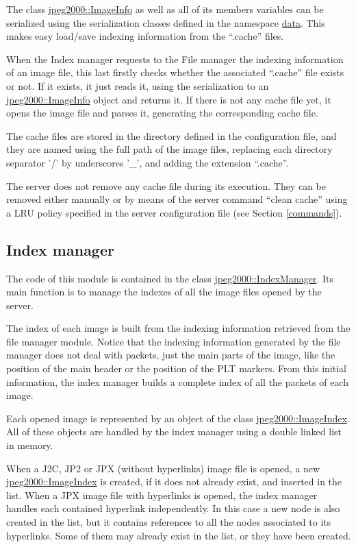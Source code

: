 The class \hyperlink{classjpeg2000_1_1ImageInfo}
{jpeg2000::ImageInfo} as well as all of its members variables
can be serialized using the serialization classes defined in
the namespace \hyperlink{namespacedata}{data}. This makes
easy load/save indexing information from the ``.cache'' files.

When the Index manager requests to the File manager the
indexing information of an image file, this last firstly checks
whether the associated ``.cache'' file exists or not. If it
exists, it just reads it, using the serialization to an 
\hyperlink{classjpeg2000_1_1ImageInfo}{jpeg2000::ImageInfo} object
and returns it. If there is not any cache file yet, it opens
the image file and parses it, generating the corresponding
cache file.

The cache files are stored in the directory defined in the configuration
file, and they are named using the full path of the image
files, replacing each directory separator '/' by underscores '\_',
and adding the extension ``.cache''. 

The server does not remove any cache file during its execution. They
can be removed either manually or by means of the server command
``clean cache'' using a LRU policy specified in the server configuration
file (see Section \ref{commands}).

\subsection{Index manager}

The code of this module is contained in the class 
\hyperlink{classjpeg2000_1_1IndexManager}{jpeg2000::IndexManager}. Its main
function is to manage the indexes of all the image files opened by the
server.

The index of each image is built from the indexing information retrieved
from the file manager module. Notice that the indexing information
generated by the file manager does not deal with packets, just the main
parts of the image, like the position of the main header or the
position of the PLT markers. From this initial information, the index
manager builds a complete index of all the packets of each image.

Each opened image is represented by an object of the class
\hyperlink{classjpeg2000_1_1ImageIndex}{jpeg2000::ImageIndex}. All
of these objects are handled by the index manager using a double linked
list in memory. 

When a J2C, JP2 or JPX (without hyperlinks) image file is opened, a
new \hyperlink{classjpeg2000_1_1ImageIndex}{jpeg2000::ImageIndex} is created,
if it does not already exist, and inserted in the list. When a JPX
image file with hyperlinks is opened, the index manager handles each
contained hyperlink independently. In this case a new node is also
created in the list, but it contains references to all the nodes
associated to its hyperlinks. Some of them may already exist in the list,
or they have been created.

